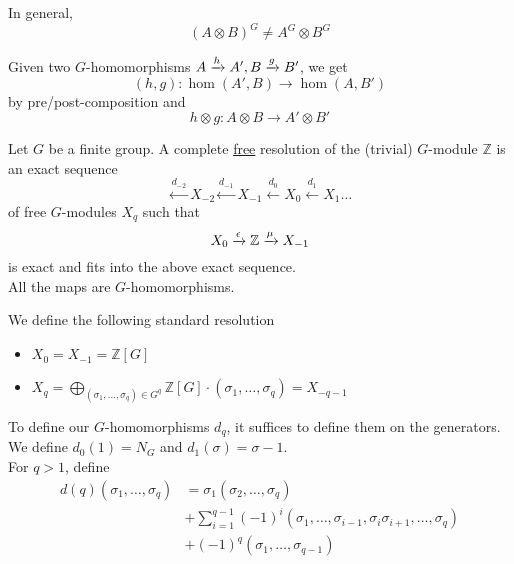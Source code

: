 \documentclass[../main.tex]{subfiles}
\begin{document}
\begin{rmq}
In general,
\[ 
	( A\otimes B)^{G}\neq A^{G}\otimes B^{G}
\]
\end{rmq}
\begin{rmq}
Given two $G$-homomorphisms $A\xrightarrow{h} A', B \xrightarrow{g} B'$, we get 
\[ 
	( h,g) : \hom( A',B) \to \hom( A,B') 
\]
by pre/post-composition and
\[ 
h\otimes g : A\otimes B \to A'\otimes B'
\]
\end{rmq}
\begin{defn}[Resolution]
	Let $G$ be a finite group. A complete \underline{free} resolution of the (trivial) $G$-module $ \mathbb{Z}$ is an exact sequence 
	\[ 
		\xleftarrow{d_{-2} } X_{-2}  \xleftarrow{d_{-1} } X_{-1} \xleftarrow{d_0} X_0 \xleftarrow{d_1} X_1\ldots
	\]
	of free $G$-modules $X_q$ such that 
	\[ 
		X_0 \xrightarrow{ \epsilon } \mathbb{Z} \xrightarrow{\mu} X_{-1} 
	\]
	is exact and fits into the above exact sequence.\\
	All the maps are $G$-homomorphisms.
\end{defn}
We define the following standard resolution
\begin{itemize}
	\item $X_0=X_{-1} = \mathbb{Z}[G]$ 
	\item $X_q= \bigoplus_{( \sigma_1,\ldots,\sigma_q) \in G^{q}} \mathbb{Z}[G] \cdot ( \sigma_1,\ldots,\sigma_q) = X_{-q-1} $ 
\end{itemize}
To define our $G$-homomorphisms $d_q$, it suffices to define them on the generators.\\
We define $d_0( 1) = N_G$ and $d_1( \sigma) = \sigma-1$.\\
For $q>1$, define 
\begin{align*}
	d( q) ( \sigma_1,\ldots,\sigma_q) &= \sigma_1 ( \sigma_2,\ldots,\sigma_q)\\
					  &+ \sum_{i=1}^{ q-1}( -1) ^{i} ( \sigma_1,\ldots,\sigma_{i-1} , \sigma_{i} \sigma_{i+1} ,\ldots, \sigma_q)\\
					  &+ ( -1)^{q}( \sigma_1,\ldots,\sigma_{q-1} ) 
\end{align*}
\end{document}
